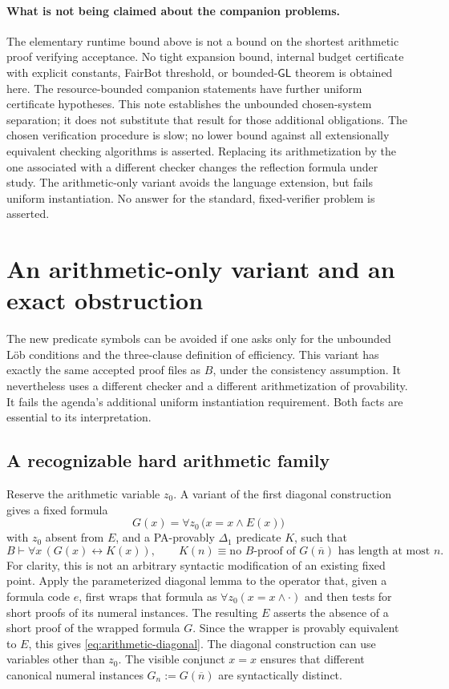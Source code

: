 \documentclass[11pt]{article}
\theoremstyle{remark}
\newcommand{\num}[1]{\overline{#1}}
\begin{document}
\paragraph{What is not being claimed about the companion problems.}
The elementary runtime bound above is not a bound on the shortest arithmetic
proof verifying acceptance. No tight expansion bound, internal budget certificate with explicit constants,
FairBot threshold, or bounded-$\mathsf{GL}$ theorem is obtained here.
The resource-bounded companion statements have further uniform certificate
hypotheses. This note establishes the unbounded chosen-system separation;
it does not substitute that result for those additional obligations.
The chosen verification procedure is slow; no lower bound against all
extensionally equivalent checking algorithms is asserted. Replacing its
arithmetization by the one associated with a different checker changes the
reflection formula under study. The arithmetic-only variant avoids the
language extension, but fails uniform instantiation. No answer for the
standard, fixed-verifier problem is asserted.

\section{An arithmetic-only variant and an exact obstruction}
\label{sec:arithmetic-variant}

The new predicate symbols can be avoided if one asks only for the unbounded
L\"ob conditions and the three-clause definition of efficiency. This variant
has exactly the same accepted proof files as $B$, under the consistency
assumption. It nevertheless uses a different checker and a different
arithmetization of provability. It fails the agenda's additional uniform
instantiation requirement. Both facts are essential to its interpretation.

\subsection{A recognizable hard arithmetic family}

Reserve the arithmetic variable $z_0$. A variant of the first diagonal
construction gives a fixed formula
\[
 G(x)=\forall z_0\,\bigl(x=x\wedge E(x)\bigr)
\]
with $z_0$ absent from $E$, and a PA-provably $\Delta_1$ predicate $K$, such
that
\begin{equation}\label{eq:arithmetic-diagonal}
 B\vdash\forall x\,(G(x)\leftrightarrow K(x)),\qquad
 K(n)\equiv\text{no $B$-proof of $G(\num n)$ has length at most $n$}.
\end{equation}
For clarity, this is not an arbitrary syntactic modification of an existing
fixed point. Apply the parameterized diagonal lemma to the operator that,
given a formula code $e$, first wraps that formula as
$\forall z_0(x=x\wedge\cdot)$ and then tests for short proofs of its numeral
instances. The resulting $E$ asserts the absence of a short proof of the
wrapped formula $G$. Since the wrapper is provably equivalent to $E$, this
gives \eqref{eq:arithmetic-diagonal}. The diagonal construction can use
variables other than $z_0$. The visible conjunct $x=x$ ensures that different
canonical numeral instances $G_n:=G(\num n)$ are syntactically distinct.
\end{document}
